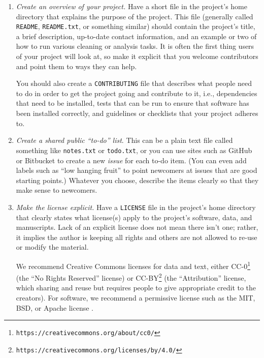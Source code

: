 \documentclass[10pt]{article}
\newcommand{\recommend}[1]{\textit{#1}}
\newcommand{\withurl}[2]{{#1}\footnote{\texttt{#2}}}
\begin{document}
\begin{enumerate}

\item
  \recommend{Create an overview of your project.}  Have a short
  file in the project's home directory that explains the 
  purpose of the project.  This file (generally called
  \texttt{README}, \texttt{README.txt}, or something similar) should
  contain the project's title, a brief description, up-to-date contact 
  information, and
  an example or two of how to run various cleaning or analysis tasks.  It is often
  the first thing users of your project will look at, so make it
  explicit that you welcome contributors and point them to ways they
  can help.

  You should also create a \texttt{CONTRIBUTING} file that describes
  what people need to do in order to get the project going and
  contribute to it, i.e., dependencies that need to be installed,
  tests that can be run to ensure that software has been installed
  correctly, and guidelines or checklists that your project adheres
  to.

\item
  \recommend{Create a shared public ``to-do'' list}.  This can be a
  plain text file called something like \texttt{notes.txt} or
  \texttt{todo.txt}, or you can use sites such as GitHub or Bitbucket
  to create a new \emph{issue} for each to-do item. (You can even add
  labels such as ``low hanging fruit'' to point newcomers at issues
  that are good starting points.)  Whatever you choose, describe the
  items clearly so that they make sense to newcomers.

\item
  \recommend{Make the license explicit.}  Have a \texttt{LICENSE} file
  in the project's home directory that clearly states what license(s)
  apply to the project's software, data, and manuscripts. Lack of an
  explicit license does not mean there isn't one; rather, it implies
  the author is keeping all rights and others are not allowed to
  re-use or modify the material.

  We recommend Creative Commons licenses for data and text, either
  \withurl{CC-0}{https://creativecommons.org/about/cc0/} (the ``No
  Rights Reserved'' license) or
  \withurl{CC-BY}{https://creativecommons.org/licenses/by/4.0/} (the
  ``Attribution'' license, which sharing and reuse but requires people
  to give appropriate credit to the creators).  For software, we
  recommend a permissive license such as the MIT, BSD, or Apache
  license \cite{laurent2004}.


\end{enumerate}
\end{document}
